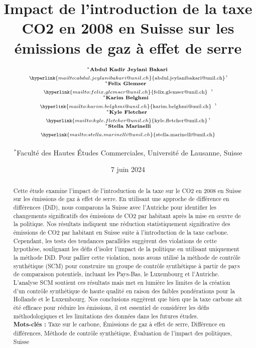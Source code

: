 \documentclass[7pt]{article}
\title{\Large \textbf{Impact de l'introduction de la taxe CO2 en 2008 en Suisse sur les émissions de gaz à effet de serre}}
\author{\small
   $
    \substack{
    ^*\text{\textbf{Abdul Kadir Jeylani Bakari}} \\\\
    \hyperlink{mailto:abdul.jeylanibakari@unil.ch}{\text{abdul.jeylanibakari@unil.ch}}
    }
    $\quad , \quad
    $
    \substack{
    ^*\text{\textbf{Felix Glemser}} \\\\
    \hyperlink{mailto:felix.glemser@unil.ch}{\text{felix.glemser@unil.ch}}
    }
    $ \quad , \quad
    $
    \substack{
    ^*\text{\textbf{Karim Belghmi}} \\\\
    \hyperlink{mailto:karim.belghmi@unil.ch}{\text{karim.belghmi@unil.ch}}
    }
    $ \quad , \quad
    $
    \substack{
    ^*\text{\textbf{Kyle Fletcher}} \\\\
    \hyperlink{mailto:kyle.fletcher@unil.ch}{\text{kyle.fletcher@unil.ch}}
    }
    $\quad , \quad
    $
    \substack{
    ^*\text{\textbf{Stella Marinelli}} \\\\
    \hyperlink{mailto:stella.marinelli@unil.ch}{\text{stella.marinelli@unil.ch}}
    }
    $
    \\\\
{\footnotesize $^*$Faculté des Hautes Études Commerciales, Université de Lausanne, Suisse}
}
\date{\small 7 juin 2024}
\begin{document}

\begin{titlingpage}
    \maketitle
\vspace*{3.12345cm}


\begin{abstract}
    \noindent Cette étude examine l'impact de l'introduction de la taxe sur le CO2 en 2008 en Suisse sur les émissions de gaz à effet de serre. En utilisant une approche de différence en différences (DiD), nous comparons la Suisse avec l'Autriche pour identifier les changements significatifs des émissions de CO2 par habitant après la mise en œuvre de la politique. Nos résultats indiquent une réduction statistiquement significative des émissions de CO2 par habitant en Suisse suite à l'introduction de la taxe carbone. Cependant, les tests des tendances parallèles suggèrent des violations de cette hypothèse, soulignant les défis d'isoler l'impact de la politique en utilisant uniquement la méthode DiD. Pour pallier cette violation, nous avons utilisé la méthode de contrôle synthétique (SCM) pour construire un groupe de contrôle synthétique à partir de pays de comparaison potentiels, incluant les Pays-Bas, le Luxembourg et l'Autriche. L'analyse SCM soutient ces résultats mais met en lumière les limites de la création d'un contrôle synthétique de haute qualité en raison des faibles pondérations pour la Hollande et le Luxembourg. Nos conclusions suggèrent que bien que la taxe carbone ait été efficace pour réduire les émissions, il est essentiel de considérer les défis méthodologiques et les limitations des données dans les futures études. \\
    

    \noindent \textbf{Mots-clés :} Taxe sur le carbone, Émissions de gaz à effet de serre, Différence en différences, Méthode de contrôle synthétique, Évaluation de l'impact des politiques, Suisse


\end{abstract}






\end{titlingpage}
\end{document}

